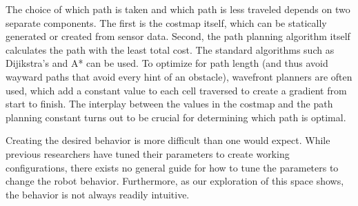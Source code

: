 The choice of which path is taken and which path is less traveled depends on two separate components. The first is the costmap itself, which can be statically generated or created from sensor data. Second, the path planning algorithm itself calculates the path with the least total cost. The standard algorithms such as Dijikstra's and A* can be used. To optimize for path length (and thus avoid wayward paths that avoid every hint of an obstacle), wavefront planners are often used, which add a constant value to each cell traversed to create a gradient from start to finish\cite{choset:principles}. The interplay between the values in the costmap and the path planning constant turns out to be crucial for determining which path is optimal. 

Creating the desired behavior is more difficult than one would expect. While previous researchers have tuned their parameters to create working configurations, there exists no general guide for how to tune the parameters to change the robot behavior. Furthermore, as our exploration of this space shows, the behavior is not always readily intuitive. 





